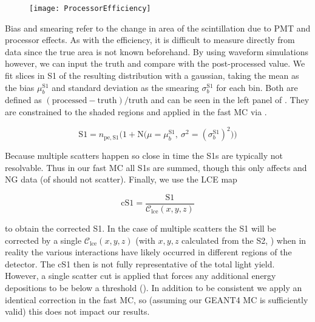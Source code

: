 \begin{figure}
\centering
\texttt{[image: ProcessorEfficiency]}
\label{fig:er_nr_calibrations_parameter_determ_det_phys_proc_eff}
\end{figure}

Bias and smearing refer to the change in area of the scintillation due to PMT and processor effects.  As with the efficiency, it is
difficult to measure directly from data since the true area is not known beforehand.  By using waveform simulations however, we can input
the truth and compare with the post-processed value.  We fit slices in S1 of the resulting distribution with a gaussian, taking the mean
as the bias $\mu_{b}^{\mathrm{S1}}$ and standard deviation as the smearing $\sigma_{b}^{\mathrm{S1}}$ for each bin.  Both are defined
as $(\mathrm{processed} - \mathrm{truth}) / \mathrm{truth}$ and can be seen in the left panel of
.  They are constrained to the shaded regions and applied in
the fast MC via .

\begin{equation}
\mathrm{S1} = n_{\mathrm{pe,S1}} \Big( 1 + \mathrm{N} \big( \mu = \mu_{b}^{\mathrm{S1}},\ \sigma^2 = (\sigma_{b}^{\mathrm{S1}})^2 \big)
\Big)
\label{eq:er_nr_calibrations_parameter_determ_det_phys_s1_bias_smear}
\end{equation}

Because multiple scatters happen so close in time the S1s are typically not resolvable.  Thus in our fast MC all S1s are summed, though
this only affects \ambe and NG data (\betadecay of  should not scatter).  Finally, we use the LCE map

\begin{equation}
\mathrm{cS1} = \frac{\mathrm{S1}}{\mathcal{C}_{\mathrm{lce}}(x, y, z)}
\label{eq:er_nr_calibrations_parameter_determ_det_phys_cs1}
\end{equation}

\noindent to obtain the corrected S1.  In the case of multiple scatters the S1 will be corrected by a single $\mathcal{C}_{\mathrm{lce}}(x, y, z)$
(with $x, y, z$ calculated from the S2, ) when in reality the various interactions have
likely occurred in different regions of the detector.  The cS1 then is not fully representative of the total light yield.  However,
a single scatter cut is applied that forces any additional energy depositions to be below a threshold
().  In addition to be
consistent we apply an identical correction in the fast MC, so (assuming our GEANT4 MC is sufficiently valid) this does not impact our
results.


